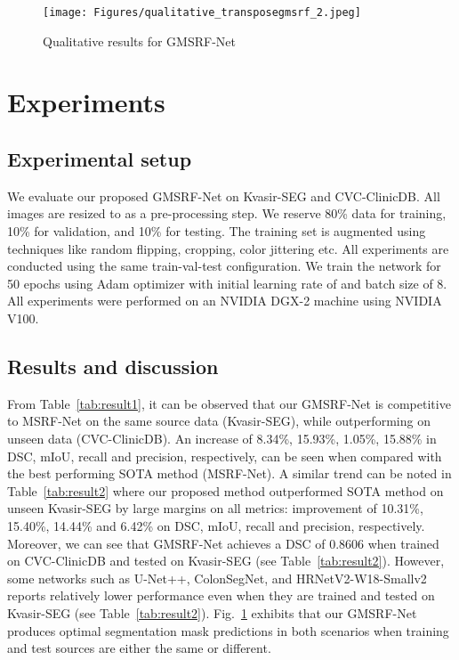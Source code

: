 \documentclass[conference]{IEEEtran}
\begin{document}
\begin{figure}[!t]
    \centering
\texttt{[image: Figures/qualitative\_transposegmsrf\_2.jpeg]}
    \caption{Qualitative results for GMSRF-Net}
    \label{fig:qualitative}
\end{figure}
\section{Experiments}
\subsection{Experimental setup}
We evaluate our proposed GMSRF-Net on Kvasir-SEG and CVC-ClinicDB. All images are resized to  as a pre-processing step. We reserve 80\% data for training, 10\% for validation, and 10\% for testing. The training set is augmented using techniques like random flipping, cropping, color jittering etc. All experiments are conducted using the same train-val-test configuration. We train the network for 50 epochs using Adam optimizer with initial learning rate of  and batch size of 8. All experiments were performed on an NVIDIA DGX-2 machine using NVIDIA V100. 

\subsection{Results and discussion}
From Table~\ref{tab:result1}, it can be observed that our GMSRF-Net is competitive to MSRF-Net on the same source data (Kvasir-SEG), while outperforming on unseen data (CVC-ClinicDB). An increase of 8.34\%, 15.93\%, 1.05\%, 15.88\% in \ac{DSC}, \ac{mIoU}, recall and precision, respectively, can be seen when compared with the best performing SOTA method (MSRF-Net). A similar trend can be noted in Table~\ref{tab:result2} where our proposed method outperformed SOTA method on unseen Kvasir-SEG by large margins on all metrics: improvement of 10.31\%, 15.40\%, 14.44\% and 6.42\% on \ac{DSC}, \ac{mIoU}, recall and precision, respectively. Moreover, we can see that GMSRF-Net achieves a \ac{DSC} of 0.8606 when trained on CVC-ClinicDB and tested on Kvasir-SEG (see Table~\ref{tab:result2}). However, some networks such as U-Net++, ColonSegNet, and HRNetV2-W18-Smallv2 reports relatively lower performance even when they are trained and tested on Kvasir-SEG (see Table~\ref{tab:result2}). Fig.~\ref{fig:qualitative} exhibits that our GMSRF-Net produces optimal segmentation mask predictions in both scenarios when training and test sources are either the same or different.
\end{document}
